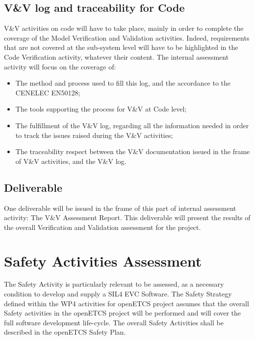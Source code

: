 \documentclass{template/openetcs_article}
\begin{document}
\subsection{V\&V log and traceability for Code}
V\&V activities on code will have to take place, mainly in order to complete the coverage of the Model Verification and Validation activities. Indeed,
requirements that are not covered at the sub-system level will have to be highlighted in the Code Verification activity, whatever their content.
The internal assessment activity will focus on the coverage of:
\begin{itemize}
\item The method and process used to fill this log, and the accordance to the CENELEC EN50128;
\item The tools supporting the process for V\&V at Code level;
\item The fulfillment of the V\&V log, regarding all the information needed in order to track the issues raised during the V\&V activities;
\item The traceability respect between the V\&V documentation issued in the frame of V\&V activities, and the V\&V log.
\end{itemize}

\subsection{Deliverable}
One deliverable will be issued in the frame of this part of internal assessment activity: The V\&V Assessment Report. This deliverable will present the results
of the overall Verification and Validation assessment for the project.

\section{Safety Activities Assessment}
The Safety Activity is particularly relevant to be assessed, as a necessary condition to develop and supply a SIL4 EVC Software. The Safety Strategy defined
within the WP4 activities for openETCS project assumes that the overall Safety activities in the openETCS project will be performed and will cover the full software development life-cycle.
The overall Safety Activities shall be described in the openETCS Safety Plan.
\end{document}
